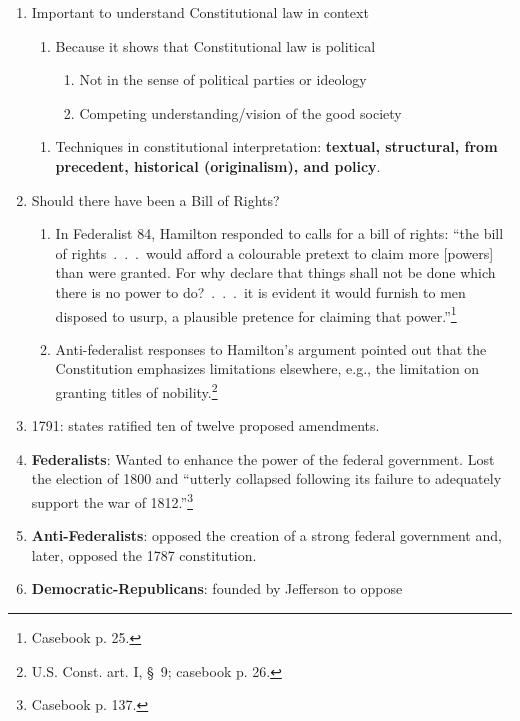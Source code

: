     \begin{enumerate} 
    \item Important to understand Constitutional law in context
    \begin{enumerate} 
    \item Because it shows that Constitutional law is political
\begin{enumerate} 
    \item Not in the sense of political parties or ideology
    \item Competing understanding/vision of the good society
    \end{enumerate}
        \end{enumerate} 
    \begin{enumerate}
    \item Techniques in constitutional interpretation: \textbf{textual, structural, from precedent, historical (originalism), and policy}.
    \end{enumerate}
    \item Should there have been a Bill of Rights?
    \begin{enumerate}
        \item In Federalist 84, Hamilton responded to calls for a bill of 
        rights: ``the bill of rights~.~.~.~would afford a colourable pretext 
        to claim more [powers] than were granted. For why declare that things 
        shall not be done which there is no power to do?~.~.~.~it is evident 
        it would furnish to men disposed to usurp, a plausible pretence for 
        claiming that power.''\footnote{Casebook p. 25.}
        \item Anti-federalist responses to Hamilton's argument pointed out 
        that the Constitution emphasizes limitations elsewhere, e.g., the 
        limitation on granting titles of nobility.\footnote{U.S. Const. art. 
        I, \S\ 9; casebook p. 26.}
    \end{enumerate}
    \item 1791: states ratified ten of twelve proposed amendments.
    \item \textbf{Federalists}: Wanted to enhance the power of the federal 
    government.  Lost the election of 1800 and ``utterly collapsed following 
    its failure to adequately support the war of 1812.''\footnote{Casebook p. 
    137.}
    \item \textbf{Anti-Federalists}: opposed the creation of a strong federal 
    government and, later, opposed the 1787 constitution.
    \item \textbf{Democratic-Republicans}: founded by Jefferson to oppose 

\end{enumerate}
